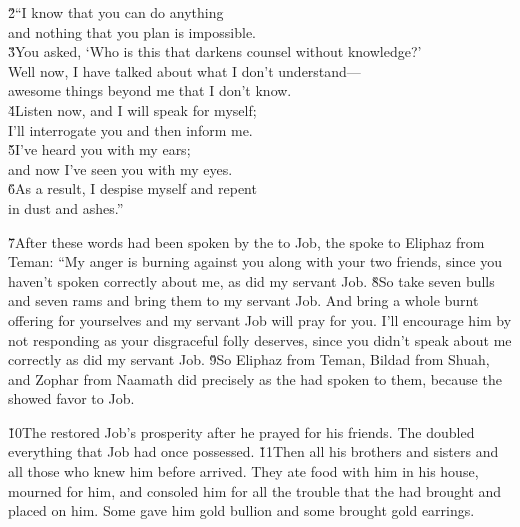 \begin{poetry}
\poeml \v{2}``I know that you can do anything \\
\poemll    and nothing that you plan is impossible. \\
\poeml \v{3}You asked, `Who is this that darkens counsel without knowledge?' \\
\poemll    Well now, I have talked about what I don't understand--- \\
\poemlll       awesome things beyond me that I don't know. \\
\poeml \v{4}Listen now, and I will speak for myself; \\
\poemll    I'll interrogate you and then inform me. \\
\poeml \v{5}I've heard you with my ears; \\
\poemll    and now I've seen you with my eyes. \\
\poeml \v{6}As a result, I despise myself and repent \\
\poemll    in dust and ashes.''
\end{poetry}

\v{7}After these words had been spoken by the  to Job, the  spoke to Eliphaz from Teman: ``My anger is burning against you along with your two friends, since you haven't spoken correctly about me, as did my servant Job. \v{8}So take seven bulls and seven rams and bring them to my servant Job. And bring a whole burnt offering for yourselves and my servant Job will pray for you. I'll encourage him by not responding as your disgraceful folly deserves, since you didn't speak about me correctly as did my servant Job. \v{9}So Eliphaz from Teman, Bildad from Shuah, and Zophar from Naamath did precisely as the  had spoken to them, because the  showed favor to Job.

\v{10}The  restored Job's prosperity after he prayed for his friends. The  doubled everything that Job had once possessed. \v{11}Then all his brothers and sisters and all those who knew him before arrived. They ate food with him in his house, mourned for him, and consoled him for all the trouble that the  had brought and placed on him. Some gave him gold bullion and some brought gold earrings.

